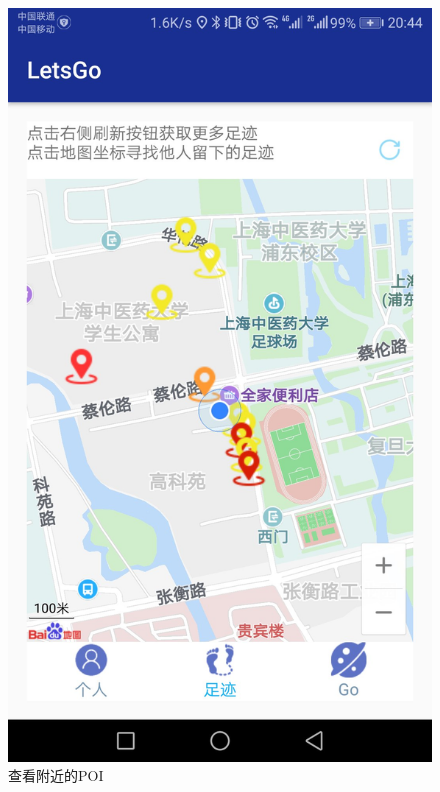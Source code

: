 \documentclass[UTF8]{article}
\begin{document}
\begin{figure}[H]
\begin{minipage}[t]{0.33\textwidth}
    \includegraphics[width=\textwidth]{images/demo_POI.jpeg}
    \caption{查看附近的POI}
\end{minipage}
\begin{minipage}[t]{0.33\textwidth}

\end{minipage}
\end{figure}
\end{document}
